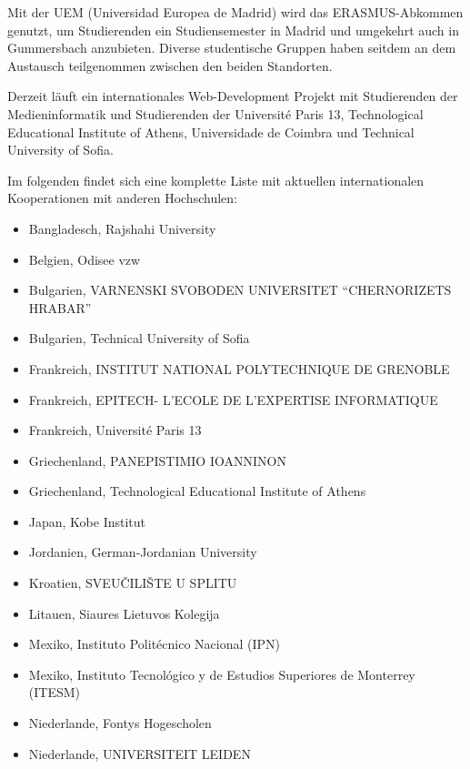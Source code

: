 Mit der UEM (Universidad Europea de Madrid) wird das ERASMUS-Abkommen
genutzt, um Studierenden ein Studiensemester in Madrid und umgekehrt
auch in Gummersbach anzubieten. Diverse studentische Gruppen haben
seitdem an dem Austausch teilgenommen zwischen den beiden Standorten.

Derzeit läuft ein internationales Web-Development Projekt mit
Studierenden der Medieninformatik und Studierenden der Université Paris
13, Technological Educational Institute of Athens, Universidade de
Coimbra und Technical University of Sofia.

Im folgenden findet sich eine komplette Liste mit aktuellen
internationalen Kooperationen mit anderen Hochschulen:

\begin{itemize}
\tightlist
\item
  Bangladesch, Rajshahi University\\
\item
  Belgien, Odisee vzw
\item
  Bulgarien, VARNENSKI SVOBODEN UNIVERSITET ``CHERNORIZETS HRABAR''
\item
  Bulgarien, Technical University of Sofia
\item
  Frankreich, INSTITUT NATIONAL POLYTECHNIQUE DE GRENOBLE\\
\item
  Frankreich, EPITECH- L'ECOLE DE L'EXPERTISE INFORMATIQUE
\item
  Frankreich, Université Paris 13
\item
  Griechenland, PANEPISTIMIO IOANNINON
\item
  Griechenland, Technological Educational Institute of Athens
\item
  Japan, Kobe Institut\\
\item
  Jordanien, German-Jordanian University\\
\item
  Kroatien, SVEUČILIŠTE U SPLITU
\item
  Litauen, Siaures Lietuvos Kolegija
\item
  Mexiko, Instituto Politécnico Nacional (IPN)\\
\item
  Mexiko, Instituto Tecnológico y de Estudios Superiores de Monterrey
  (ITESM)\\
\item
  Niederlande, Fontys Hogescholen
\item
  Niederlande, UNIVERSITEIT LEIDEN\\

\end{itemize}
